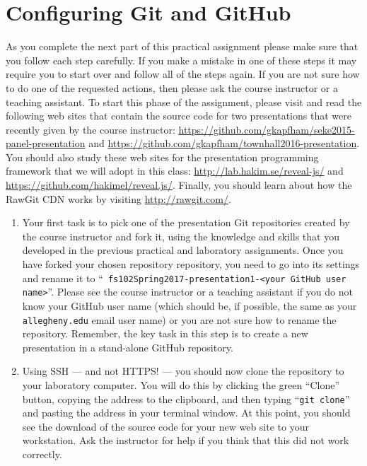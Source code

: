 \section*{Configuring Git and GitHub}

As you complete the next part of this practical assignment please make sure that you follow each step carefully. If you
make a mistake in one of these steps it may require you to start over and follow all of the steps again. If you are not
sure how to do one of the requested actions, then please ask the course instructor or a teaching assistant. To start
this phase of the assignment, please visit and read the following web sites that contain the source code for two
presentations that were recently given by the course instructor:
\url{https://github.com/gkapfham/seke2015-panel-presentation} and
\url{https://github.com/gkapfham/townhall2016-presentation}. You should also study these web sites for the presentation
programming framework that we will adopt in this class: \url{http://lab.hakim.se/reveal-js/} and
\url{https://github.com/hakimel/reveal.js/}. Finally, you should learn about how the RawGit CDN works by visiting
\url{http://rawgit.com/}.

\begin{enumerate}

  \item Your first task is to pick one of the presentation Git repositories created by the course instructor and fork
    it, using the knowledge and skills that you developed in the previous practical and laboratory assignments. Once you
    have forked your chosen repository repository, you need to go into its settings and rename it to ``{\tt
    fs102Spring2017-presentation1-<your GitHub user name>}''. Please see the course instructor or a teaching assistant
    if you do not know your GitHub user name (which should be, if possible, the same as your {\tt allegheny.edu} email
    user name) or you are not sure how to rename the repository. Remember, the key task in this step is to create a new
    presentation in a stand-alone GitHub repository.

  \item Using SSH --- and not HTTPS! --- you should now clone the repository to your laboratory computer. You will do
    this by clicking the green ``Clone'' button, copying the address to the clipboard, and then typing ``{\tt git
    clone}'' and pasting the address in your terminal window. At this point, you should see the download of the source
    code for your new web site to your workstation. Ask the instructor for help if you think that this did not work
    correctly.

\end{enumerate}

